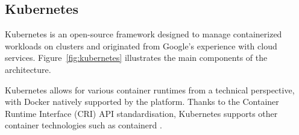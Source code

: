 \subsection{Kubernetes}
\label{sec:kubernetes}

Kubernetes \cite{kubernetes} is an open-source framework designed to manage containerized workloads on clusters and originated from Google's experience with cloud services. Figure~\ref{fig:kubernetes} illustrates the main components of the architecture.


Kubernetes allows for various container runtimes from a technical perspective, with Docker natively supported by the platform. Thanks to the Container Runtime Interface (CRI) API standardisation, Kubernetes supports other container technologies such as containerd \cite{containerd}.



